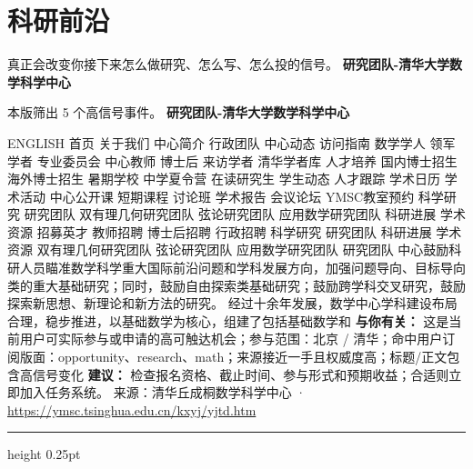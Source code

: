 \documentclass[10.5pt]{ctexart}
\begin{document}
\section*{科研前沿}
{\color{ormuted} 真正会改变你接下来怎么做研究、怎么写、怎么投的信号。}
\vspace{2mm}
{\LARGE\bfseries 研究团队-清华大学数学科学中心}\par
\vspace{1mm}
{\color{ormuted} 本版筛出 5 个高信号事件。}
\vspace{3mm}
{\Large\bfseries 研究团队-清华大学数学科学中心}\par
ENGLISH 首页 关于我们 中心简介 行政团队 中心动态 访问指南 数学学人 领军学者 专业委员会 中心教师 博士后 来访学者 清华学者库 人才培养 国内博士招生 海外博士招生 暑期学校 中学夏令营 在读研究生 学生动态 人才跟踪 学术日历 学术活动 中心公开课 短期课程 讨论班 学术报告 会议论坛 YMSC教室预约 科学研究 研究团队 双有理几何研究团队 弦论研究团队 应用数学研究团队 科研进展 学术资源 招募英才 教师招聘 博士后招聘 行政招聘 科学研究 研究团队 科研进展 学术资源 双有理几何研究团队 弦论研究团队 应用数学研究团队 研究团队 中心鼓励科研人员瞄准数学科学重大国际前沿问题和学科发展方向，加强问题导向、目标导向类的重大基础研究；同时，鼓励自由探索类基础研究；鼓励跨学科交叉研究，鼓励探索新思想、新理论和新方法的研究。 经过十余年发展，数学中心学科建设布局合理，稳步推进，以基础数学为核心，组建了包括基础数学和
\textbf{与你有关：} 这是当前用户可实际参与或申请的高可触达机会；参与范围：北京 / 清华；命中用户订阅版面：opportunity、research、math；来源接近一手且权威度高；标题/正文包含高信号变化
\textbf{建议：} 检查报名资格、截止时间、参与形式和预期收益；合适则立即加入任务系统。
{\footnotesize\color{ormuted} 来源：清华丘成桐数学科学中心 · \url{https://ymsc.tsinghua.edu.cn/kxyj/yjtd.htm}}
\vspace{4mm}
\hrule height 0.25pt
\vspace{3mm}
\end{document}

